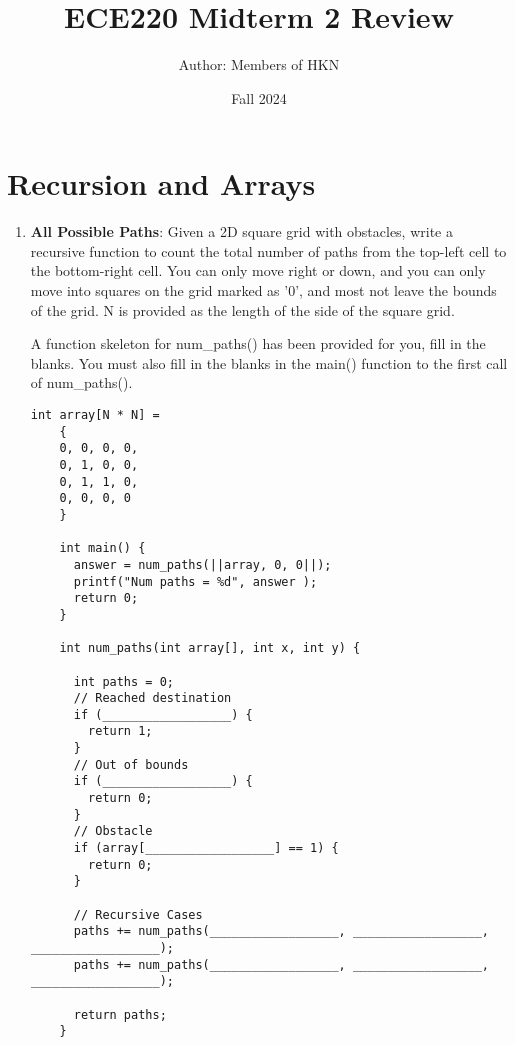 \documentclass{article}
\title{ECE220 Midterm 2 Review}
\author{Author: Members of HKN}
\date{Fall 2024}
\begin{document}
\maketitle

\section{
    Recursion and Arrays
}

\begin{enumerate}[label=(\alph*), itemsep = 120pt]
    \item \textbf{All Possible Paths}: Given a 2D square grid with obstacles, write a recursive function to count the total number of paths from the top-left cell to the bottom-right cell. You can only move right or down, and you can only move into squares on the grid marked as '0', and most not leave the bounds of the grid. N is provided as the length of the side of the square grid.
    
    A function skeleton for num\_paths() has been provided for you, fill in the blanks. You must also fill in the blanks in the main() function to the first call of num\_paths().

    \begin{lstlisting}[style=CStyle]
    int array[N * N] = 
    {
    0, 0, 0, 0,
    0, 1, 0, 0,
    0, 1, 1, 0,
    0, 0, 0, 0 
    }
    
    int main() {
      answer = num_paths(||array, 0, 0||);
      printf("Num paths = %d", answer );
      return 0;
    }
    
    int num_paths(int array[], int x, int y) {
      
      int paths = 0;
      // Reached destination
      if (__________________) {
        return 1;
      }
      // Out of bounds
      if (__________________) {
        return 0;
      }
      // Obstacle
      if (array[__________________] == 1) {
        return 0;
      }
      
      // Recursive Cases
      paths += num_paths(__________________, __________________, __________________);
      paths += num_paths(__________________, __________________, __________________);
    
      return paths;
    } \end{lstlisting}



\end{enumerate}
\end{document}
